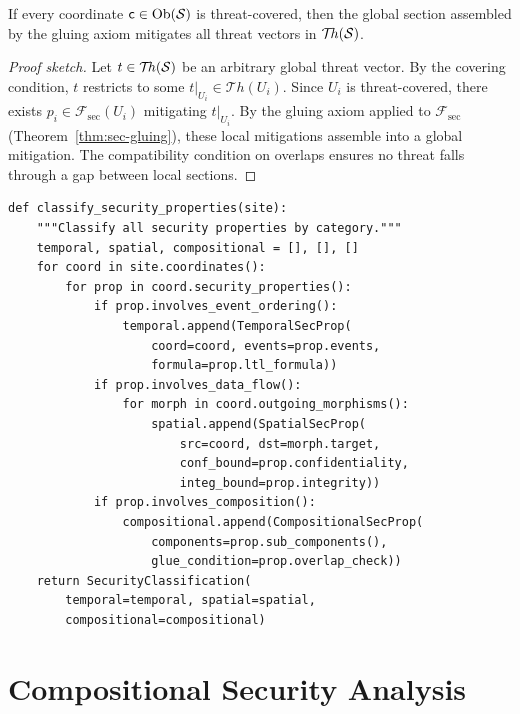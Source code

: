 \documentclass[11pt]{article}
\newcommand{\SecSheaf}{\mathcal{F}_{\mathrm{sec}}}
\begin{document}
\begin{theorem}\label{thm:sec-coverage}
If every coordinate $\mathsf{c} \in \mathrm{Ob}(\mathcal{S})$ is threat-covered, then
the global section assembled by the gluing axiom mitigates all threat
vectors in $\mathcal{T}\!h(\mathcal{S})$.
\end{theorem}

\begin{proof}[Proof sketch]
Let $t \in \mathcal{T}\!h(\mathcal{S})$ be an arbitrary global threat
vector.  By the covering condition, $t$ restricts to some
$t|_{U_i} \in \mathcal{T}\!h(U_i)$.  Since $U_i$ is threat-covered,
there exists $p_i \in \SecSheaf(U_i)$ mitigating $t|_{U_i}$.  By the
gluing axiom applied to $\SecSheaf$ (Theorem~\ref{thm:sec-gluing}),
these local mitigations assemble into a global mitigation.  The
compatibility condition on overlaps ensures no threat falls through a
gap between local sections.
\end{proof}

\begin{lstlisting}[style=jugeo-python]
def classify_security_properties(site):
    """Classify all security properties by category."""
    temporal, spatial, compositional = [], [], []
    for coord in site.coordinates():
        for prop in coord.security_properties():
            if prop.involves_event_ordering():
                temporal.append(TemporalSecProp(
                    coord=coord, events=prop.events,
                    formula=prop.ltl_formula))
            if prop.involves_data_flow():
                for morph in coord.outgoing_morphisms():
                    spatial.append(SpatialSecProp(
                        src=coord, dst=morph.target,
                        conf_bound=prop.confidentiality,
                        integ_bound=prop.integrity))
            if prop.involves_composition():
                compositional.append(CompositionalSecProp(
                    components=prop.sub_components(),
                    glue_condition=prop.overlap_check))
    return SecurityClassification(
        temporal=temporal, spatial=spatial,
        compositional=compositional)
\end{lstlisting}

\section{Compositional Security Analysis}\label{sec:compositional}
\end{document}
